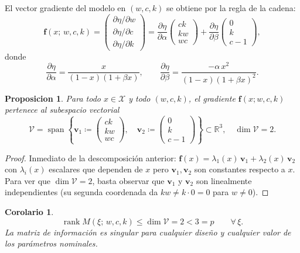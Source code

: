 \documentclass[11pt, a4paper]{article}
\newtheorem{proposition}{Proposicion}
\newtheorem{corollary}{Corolario}
\DeclareMathOperator{\rank}{rank}
\DeclareMathOperator{\spn}{span}
\newcommand{\R}{\mathbb{R}}
\newcommand{\ff}{\mathbf{f}}
\begin{document}
El vector gradiente del modelo en $(w, c, k)$ se obtiene por la regla de la cadena:
\[
  \ff(x;\,w,c,k) =
  \begin{pmatrix}
    \partial\eta/\partial w \\[4pt]
    \partial\eta/\partial c \\[4pt]
    \partial\eta/\partial k
  \end{pmatrix}
  = \frac{\partial \eta}{\partial \alpha}
    \begin{pmatrix} ck \\ kw \\ wc \end{pmatrix}
  + \frac{\partial \eta}{\partial \beta}
    \begin{pmatrix} 0 \\ k \\ c-1 \end{pmatrix},
\]
donde
\[
  \frac{\partial \eta}{\partial \alpha}
  = \frac{x}{(1-x)(1+\beta x)},
  \qquad
  \frac{\partial \eta}{\partial \beta}
  = \frac{-\alpha\,x^2}{(1-x)(1+\beta x)^2}.
\]

\begin{proposition}
Para todo $x \in \mathcal{X}$ y todo $(w,c,k)$, el gradiente $\ff(x;w,c,k)$ pertenece al
subespacio vectorial
\[
  \mathcal{V} = \spn\!\left\{
    \mathbf{v}_1 \coloneqq
    \begin{pmatrix} ck \\ kw \\ wc \end{pmatrix},\quad
    \mathbf{v}_2 \coloneqq
    \begin{pmatrix} 0 \\ k \\ c-1 \end{pmatrix}
  \right\} \subset \R^3,
  \quad \dim\mathcal{V} = 2.
\]
\end{proposition}

\begin{proof}
Inmediato de la descomposici\'on anterior:
$\ff(x) = \lambda_1(x)\,\mathbf{v}_1 + \lambda_2(x)\,\mathbf{v}_2$
con $\lambda_i(x)$ escalares que dependen de $x$ pero $\mathbf{v}_1, \mathbf{v}_2$ son
constantes respecto a $x$.  Para ver que $\dim\mathcal{V} = 2$, basta observar que
$\mathbf{v}_1$ y $\mathbf{v}_2$ son linealmente independientes (su segunda coordenada da
$kw \neq k\cdot 0 = 0$ para $w \neq 0$).
\end{proof}

\begin{corollary}
\[
  \rank M(\xi;\, w,c,k)
  \leq \dim\mathcal{V} = 2 < 3 = p
  \qquad \forall\, \xi.
\]
La matriz de informaci\'on es singular para \emph{cualquier} dise\~no y \emph{cualquier}
valor de los par\'ametros nominales.
\end{corollary}
\end{document}
